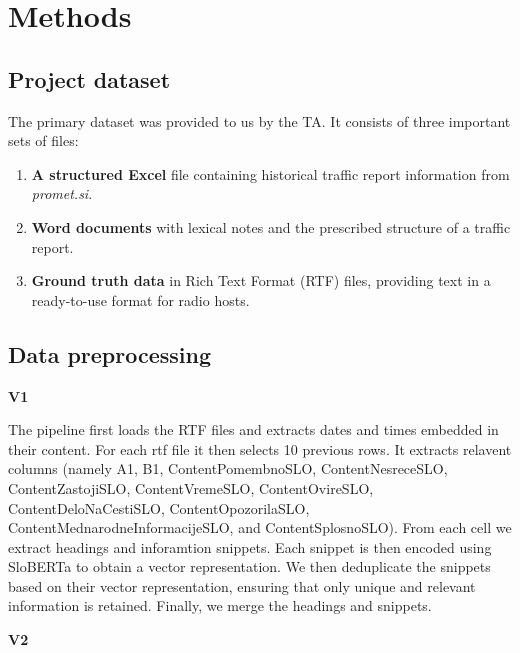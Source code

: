 \documentclass[fleqn,moreauthors,10pt]{ds_report}
\begin{document}
\section{Methods}

\subsection*{Project dataset}

The primary dataset was provided to us by the TA. It consists of three important sets of files:

\begin{enumerate}
    \item \textbf{A structured Excel }file containing historical traffic report information from \textit{promet.si}.
    \item \textbf{Word documents} with lexical notes and the prescribed structure of a traffic report.
    \item \textbf{Ground truth data} in Rich Text Format (RTF) files, providing text in a ready-to-use format for radio hosts.
\end{enumerate}


\subsection*{Data preprocessing}

\vspace{1em} %
\noindent \textbf{V1}
\vspace{0.5em} %

The pipeline first loads the RTF files and extracts dates and times embedded in their content. For each rtf file it then selects 10 previous rows. It extracts relavent columns (namely A1, B1, ContentPomembnoSLO, ContentNesreceSLO, ContentZastojiSLO, ContentVremeSLO, ContentOvireSLO, ContentDeloNaCestiSLO, ContentOpozorilaSLO, ContentMednarodneInformacijeSLO, and ContentSplosnoSLO). From each cell we extract headings and inforamtion snippets. Each snippet is then encoded using SloBERTa \cite{SloBERTa} to obtain a vector representation. We then deduplicate the snippets based on their vector representation, ensuring that only unique and relevant information is retained. Finally, we merge the headings and snippets.

\vspace{1em} %
\noindent \textbf{V2}
\vspace{0.5em} %
\end{document}
